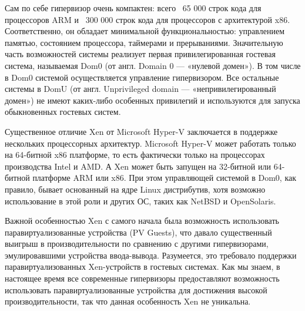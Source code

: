 \documentclass[14pt, a4paper]{article}
\begin{document}
\begin{figure}[h]%
    \centering
    \label{2.1} %
\end{figure}

Сам по себе гипервизор очень компактен: всего ~65 000 строк кода для процессоров ARM и ~300 000
строк кода для процессоров с архитектурой x86. Соответственно, он обладает минимальной
функциональностью: управлением памятью, состоянием процессора, таймерами и прерываниями.
Значительную часть возможностей системы реализует первая привилегированная гостевая система,
называемая Dom0 (от англ. Domain 0 — «нулевой домен»). В том числе в Dom0 системой
осуществляется управление гипервизором. Все остальные системы в DomU (от англ. Unprivileged
domain — «непривилегированный домен») не имеют каких-либо особенных привилегий и
используются для запуска обыкновенных гостевых систем.


Существенное отличие Xen от Microsoft Hyper-V заключается в поддержке нескольких процессорных
архитектур. Microsoft Hyper-V может работать только на 64-битной x86 платформе, то есть фактически
только на процессорах производства Intel и AMD. А Xen может быть запущен на 32-битной или
64-битной платформе ARM или x86. При этом управляющей системой в Dom0, как правило, бывает
основанный на ядре Linux дистрибутив, хотя возможно использование в этой роли и других ОС, таких
как NetBSD и OpenSolaris.


Важной особенностью Xen с самого начала была возможность использовать паравиртуализованные
устройства (PV Guests), что давало существенный выигрыш в производительности по сравнению с
другими гипервизорами, эмулировавшими устройства ввода-вывода. Разумеется, это требовало
поддержки паравиртуализованных Xen-устройств в гостевых системах. Как мы знаем, в настоящее
время все современные гипервизоры предоставляют возможность использовать
паравиртуализованные устройства для достижения высокой производительности, так что данная
особенность Xen не уникальна.
\end{document}
